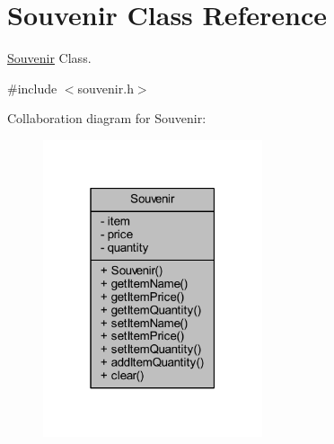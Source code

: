 \hypertarget{class_souvenir}{}\section{Souvenir Class Reference}
\label{class_souvenir}


\hyperlink{class_souvenir}{Souvenir} Class.  




{\ttfamily \#include $<$souvenir.\+h$>$}



Collaboration diagram for Souvenir\+:
\nopagebreak
\begin{figure}[H]
\begin{center}
\leavevmode
\includegraphics[width=183pt]{class_souvenir__coll__graph}
\end{center}
\end{figure}
